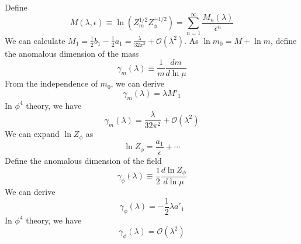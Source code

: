 Define
\[M(\lambda,\epsilon) \equiv \ln(Z_{m}^{1/2} Z_{\phi}^{-1/2}) = \sum_{n=1}^{\infty} \frac{M_n(\lambda)}{\epsilon^n}\]
We can calculate $M_1 = \frac{1}{2}b_1 - \frac{1}{2}a_1 = \frac{\lambda}{32\pi^2} + \mathcal{O}(\lambda^2)$.
As $\ln m_0 = M + \ln m $, define the anomalous dimension of the mass
\[\gamma_m(\lambda) \equiv \frac{1}{m} \frac{dm}{d \ln \mu}\]
From the independence of $m_0$, we can derive
\[\gamma_m(\lambda) = \lambda M'_1\]
In $\phi^4$ theory, we have
\[\gamma_m(\lambda) = \frac{\lambda}{32\pi^2} + \mathcal{O}(\lambda^2)\]
We can expand $\ln Z_{\phi}$ as
\[\ln Z_{\phi} = \frac{a_1}{\epsilon} + \cdots\]
Define the anomalous dimension of the field
\[\gamma_{\phi}(\lambda) \equiv \frac{1}{2} \frac{d\ln Z_{\phi}}{d \ln \mu}\]
We can derive
\[\gamma_{\phi}(\lambda) = -\frac{1}{2}\lambda a'_1\]
In $\phi^4$ theory, we have
\[\gamma_{\phi}(\lambda) = \mathcal{O}(\lambda^2)\]

